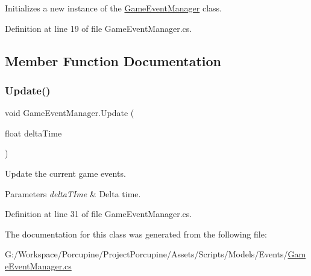 Initializes a new instance of the \hyperlink{class_game_event_manager}{Game\+Event\+Manager} class. 



Definition at line 19 of file Game\+Event\+Manager.\+cs.



\subsection{Member Function Documentation}
\mbox{\label{class_game_event_manager_aeff8359d24a5c9221ab2b5168c66278e}} 
\subsubsection{\texorpdfstring{Update()}{Update()}}
{\footnotesize\ttfamily void Game\+Event\+Manager.\+Update (\begin{DoxyParamCaption}\item[{float}]{delta\+Time }\end{DoxyParamCaption})}



Update the current game events. 


\begin{DoxyParams}{Parameters}
{\em delta\+T\+Ime} & Delta time.\\
\hline
\end{DoxyParams}


Definition at line 31 of file Game\+Event\+Manager.\+cs.



The documentation for this class was generated from the following file\+:\begin{DoxyCompactItemize}
\item 
G\+:/\+Workspace/\+Porcupine/\+Project\+Porcupine/\+Assets/\+Scripts/\+Models/\+Events/\hyperlink{_game_event_manager_8cs}{Game\+Event\+Manager.\+cs}\end{DoxyCompactItemize}

